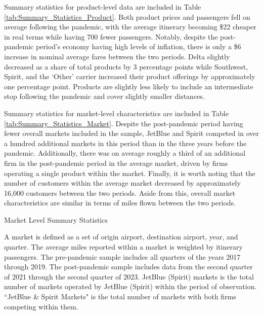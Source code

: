\documentclass{article}
\begin{document}
    Summary statistics for product-level data are included in Table \ref{tab:Summary_Statistics_Product}. Both product prices and passengers fell on average following the pandemic, with the average itinerary becoming \$22 cheaper in real terms while having 700 fewer passengers. Notably, despite the post-pandemic period's economy having high levels of inflation, there is only a \$6 increase in nominal average fares between the two periods.  Delta slightly decreased as a share of total products by 3 percentage points while Southwest, Spirit, and the `Other' carrier increased their product offerings by approximately one percentage point. Products are slightly less likely to include an intermediate stop following the pandemic and cover slightly smaller distances. 

    Summary statistics for market-level characteristics are included in Table \ref{tab:Summary_Statistics_Market}. Despite the post-pandemic period having fewer overall markets included in the sample, JetBlue and Spirit competed in over a hundred additional markets in this period than in the three years before the pandemic. Additionally, there was on average roughly a third of an additional firm in the post-pandemic period in the average market, driven by firms operating a single product within the market. Finally, it is worth noting that the number of customers within the average market decreased by approximately 16,000 customers between the two periods. Aside from this, overall market characteristics are similar in terms of miles flown between the two periods. 

    \begin{table}
        \caption{Market Level Summary Statistics}
        \label{tab:Summary_Statistics_Market}
                \vspace{-15mm}
\begin{center}
            
            \footnotesize{A market is defined as a set of origin airport, destination airport, year, and quarter. The average miles reported within a market is weighted by itinerary passengers. The pre-pandemic sample includes all quarters of the years 2017 through 2019. The post-pandemic sample includes data from the second quarter of 2021 through the second quarter of 2023. JetBlue (Spirit) markets is the total number of markets operated by JetBlue (Spirit) within the period of observation. ``JetBlue \& Spirit Markets" is the total number of markets with both firms competing within them.}

\end{center}
    \end{table}
\end{document}

